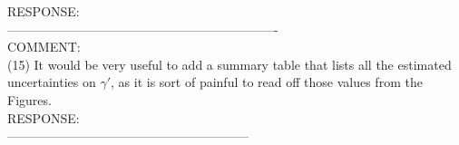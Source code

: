 \documentclass[a4paper,11pt]{article}
\begin{document}
RESPONSE:
\\

----------------------------------------------------------------
\\
COMMENT:
\\
(15) It would be very useful to add a summary table that lists all the estimated uncertainties on $\gamma'$, as it is sort of painful to read off those values from the Figures.
\\

RESPONSE:
\\

---------------------------------------------------------
\end{document}
